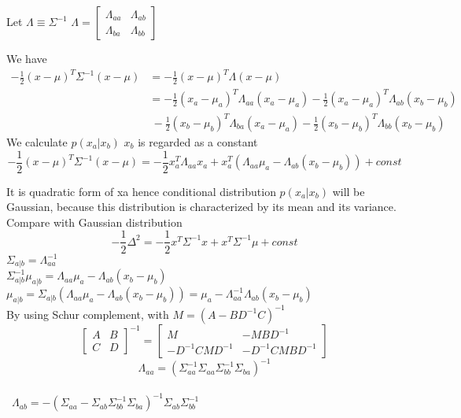 \documentclass[12pt,letterpaper]{article}
\begin{document}
	Let \(\Lambda \equiv \Sigma^{-1}\) \rightarrow \(\Lambda = \begin{bmatrix}\Lambda_{aa} & \Lambda_{ab}\\\Lambda_{ba} & \Lambda_{bb}\end{bmatrix}\)
	
	We have
	\begin{equation*}
	    \begin{split}
            -\frac{1}{2}(x-\mu)^T\Sigma^{-1}(x-\mu) &= -\frac{1}{2}(x-\mu)^T\Lambda(x-\mu)\\
                                                    &= -\frac{1}{2}(x_a-\mu_a)^T\Lambda_{aa}(x_a-\mu_a) - \frac{1}{2}(x_a-\mu_a)^T\Lambda_{ab}(x_b-\mu_b)\\
                                                    &\ -\frac{1}{2}(x_b-\mu_b)^T\Lambda_{ba}(x_a-\mu_a) - \frac{1}{2}(x_b-\mu_b)^T\Lambda_{bb}(x_b-\mu_b)
	    \end{split}
	\end{equation*}
	We calculate \(p(x_a|x_b)\) \rightarrow \(x_b\) is regarded as a constant
	\begin{equation*}
	    -\frac{1}{2}(x-\mu)^T\Sigma^{-1}(x-\mu) = -\frac{1}{2}x_a^T\Lambda_{aa}x_a + x_a^T(\Lambda_{aa}\mu_a -\Lambda_{ab}(x_b-\mu_b)) + const
	\end{equation*}
	
	It is quadratic form of xa hence conditional distribution \(p(x_a|x_b)\) will be Gaussian, because this distribution is characterized by its mean and its variance. Compare with Gaussian distribution
	\begin{equation*}
	    -\frac{1}{2}\Delta^2 = -\frac{1}{2}x^T\Sigma^{-1}x + x^T\Sigma^{-1}\mu + const
	\end{equation*}
	\rightarrow \(\Sigma_{a|b} = \Lambda_{aa}^{-1}\) \\
	\rightarrow \(\Sigma_{a|b}^{-1}\mu_{a|b} = \Lambda_{aa}\mu_a -\Lambda_{ab}(x_b-\mu_b)\)\\
	\rightarrow \(\mu_{a|b} = \Sigma_{a|b}(\Lambda_{aa}\mu_a -\Lambda_{ab}(x_b-\mu_b)) = \mu_a - \Lambda_{aa}^{-1}\Lambda_{ab}(x_b-\mu_b)\)\\
	
	By using Schur complement, with \(M = (A - BD^{-1}C)^{-1}\)
	\[\begin{bmatrix}A & B\\C & D\end{bmatrix}^{-1} = \begin{bmatrix}M & -MBD^{-1}\\-D^{-1}CMD^{-1} & -D^{-1}CMBD^{-1}\end{bmatrix}\]
	\rightarrow \[\Lambda_{aa} = (\Sigma_{aa}^{-1}\Sigma_{aa}\Sigma_{bb}^{-1}\Sigma_{ba})^{-1}\]\\
	\ \(\Lambda_{ab} = -(\Sigma_{aa}-\Sigma_{ab}\Sigma_{bb}^{-1}\Sigma_{ba})^{-1}\Sigma_{ab}\Sigma_{bb}^{-1}\)\\
	
\end{document}
